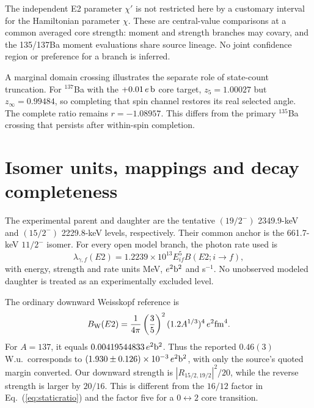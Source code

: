 The independent E2 parameter $\chi'$ is not restricted here by a
customary interval for the Hamiltonian parameter $\chi$.
These are central-value comparisons at a common averaged core
strength: moment and strength branches may covary, and the 135/137Ba
moment evaluations share source lineage. No joint confidence region
or preference for a branch is inferred.

A marginal domain crossing illustrates the separate role of
state-count truncation. For $^{137}$Ba with the
$+0.01\,e\,{\rm b}$ core target, $z_5=1.00027$ but
$z_\infty=0.99484$, so completing that spin channel restores its
real selected angle. The complete ratio remains $r=-1.08957$.
This differs from the primary $^{135}$Ba crossing that persists
after within-spin completion.

\section{Isomer units, mappings and decay completeness}\label{app:isomer}

The experimental parent and daughter are the tentative $(19/2^-)$
2349.9-keV and $(15/2^-)$ 2229.8-keV levels, respectively.
Their common anchor is the 661.7-keV $11/2^-$ isomer.
For every open model branch, the photon rate used is
\begin{equation}
\lambda_{\gamma,f}(E2)=1.2239\times10^{13}
 E_{if}^{5}B(E2;i\to f),
\end{equation}
with energy, strength and rate units MeV, $e^2{\rm b}^2$ and s$^{-1}$.
No unobserved modeled daughter is treated as an experimentally excluded level.

The ordinary downward Weisskopf reference is
\begin{equation}
B_{\rm W}(E2)=\frac1{4\pi}\left(\frac35\right)^2
(1.2A^{1/3})^4\,e^2{\rm fm}^4.
\end{equation}
For $A=137$, it equals $0.00419544833\,e^2{\rm b}^2$.
Thus the reported $0.46(3)$ W.u.\ corresponds to
$(1.930\pm0.126)\times10^{-3}\,e^2{\rm b}^2$,
with only the source's quoted margin converted.
Our downward strength is
$|R_{15/2,19/2}|^2/20$, while the reverse strength is larger
by $20/16$. This is different from the $16/12$ factor in
Eq.~(\ref{eq:staticratio}) and the factor five for a $0\leftrightarrow2$
core transition.

